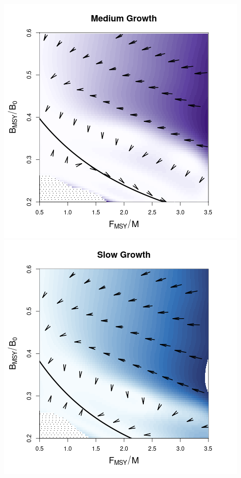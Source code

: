 \documentclass[a0paper,portrait]{baposter}
\begin{document}
\begin{poster}
{\begin{minipage}[h!]{0.61\textwidth}
\begin{minipage}[h!]{0.24\textwidth}
        	\includegraphics[width=\textwidth]{../../ddBias/directionalBiasDDSubFlatT45N150A0-1AS1K0.5N56Purples.png}\\
        	\includegraphics[width=\textwidth]{../../ddBias/directionalBiasDDSubFlatT45N150A0-1AS2K0.1N84EdgeBlues.png}
        	\end{minipage}


\end{minipage}}
\end{poster}
\end{document}
